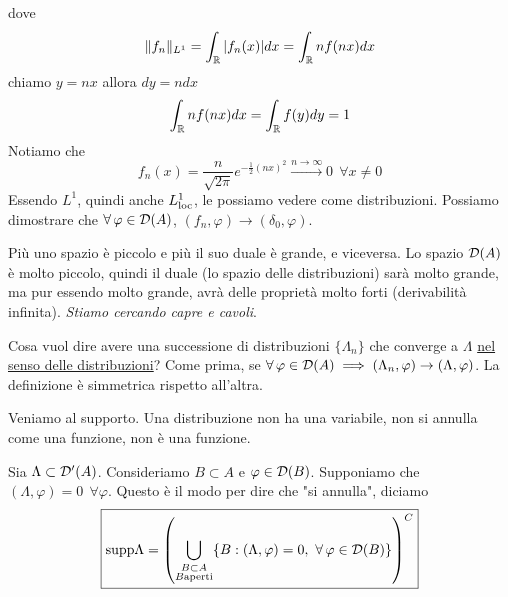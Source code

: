 dove
\begin{equation*}
\Vert f_{n} \Vert_{L^{1}} = \int_{\mathbb{R}}| f_{n}(x)| dx = \int_{\mathbb{R}} nf(nx) dx
\end{equation*}
chiamo $y = nx$ allora $dy = ndx$
\begin{equation*}
\int_{\mathbb{R}} nf(nx) dx = \int_{\mathbb{R}} f(y) dy = 1
\end{equation*}
Notiamo che
\begin{equation*}
f_{n}(x) = \frac{n}{\sqrt{2\pi}} e^{- \frac{1}{2}(nx)^{2}}\xrightarrow{n\rightarrow \infty} 0\ \ \forall x\neq 0
\end{equation*}
Essendo $L^{1}$, quindi anche $L^{1}_{\operatorname{loc}}$, le possiamo vedere come distribuzioni. Possiamo dimostrare che $\forall \varphi \in \Dc(A)$, $(f_{n}, \varphi)\rightarrow (\delta_{0}, \varphi)$.

Più uno spazio è piccolo e più il suo duale è grande, e viceversa. Lo spazio $\mathcal{D}(A)$ è molto piccolo, quindi il duale (lo spazio delle distribuzioni) sarà molto grande, ma pur essendo molto grande, avrà delle proprietà molto forti (derivabilità infinita). \textit{Stiamo cercando capre e cavoli}.

\begin{defn}
Cosa vuol dire avere una successione di distribuzioni $\{\Lambda_{n}\}$ che converge a $\Lambda $ \underline{nel senso delle distribuzioni}? Come prima, se $\forall \varphi \in \Dc(A) \implies (\Lambda_{n}, \varphi)\rightarrow (\Lambda, \varphi)$. La definizione è simmetrica rispetto all'altra.
\end{defn}
Veniamo al supporto. Una distribuzione non ha una variabile, non si annulla come una funzione, non è una funzione.
\begin{defn}
Sia $\Lambda \subset \mathcal{D}'(A)$. Consideriamo $B\subset A$ e $\varphi \in \mathcal{D}(B)$. Supponiamo che $(\Lambda, \varphi) = 0\ \ \forall \varphi $. Questo è il modo per dire che "si annulla", diciamo
\begin{equation*}
\boxed{
\mathrm{supp} \Lambda =
\left(\bigcup_{\substack{B\subset A\\B\text{aperti}}} \{B: (\Lambda, \varphi) = 0, \ \forall \varphi \in \Dc(B)\}\right)^{C}
}
\end{equation*}
\end{defn}


